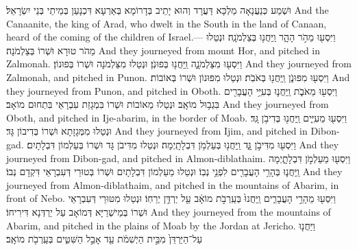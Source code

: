 {וּשְׁמַע כְּנַעֲנָאָה מַלְכָּא דַּעֲרָד וְהוּא יָתֵיב בְּדָרוֹמָא בְּאַרְעָא דִּכְנָעַן בְּמֵיתֵי בְּנֵי יִשְׂרָאֵל׃}
{And the Canaanite, the king of Arad, who dwelt in the South in the land of Canaan, heard of the coming of the children of Israel.—}{}
{וַיִּסְע֖וּ מֵהֹ֣ר הָהָ֑ר וַֽיַּחֲנ֖וּ בְּצַלְמֹנָֽה׃}
{וּנְטַלוּ מֵהֹר טוּרָא וּשְׁרוֹ בְּצַלְמֹנָה׃}
{And they journeyed from mount Hor, and pitched in Zalmonah.}{}
{וַיִּסְע֖וּ מִצַּלְמֹנָ֑ה וַֽיַּחֲנ֖וּ בְּפוּנֹֽן׃}
{וּנְטַלוּ מִצַּלְמֹנָה וּשְׁרוֹ בְּפוּנוֹן׃}
{And they journeyed from Zalmonah, and pitched in Punon.}{}
{וַיִּסְע֖וּ מִפּוּנֹ֑ן וַֽיַּחֲנ֖וּ בְּאֹבֹֽת׃}
{וּנְטַלוּ מִפּוּנוֹן וּשְׁרוֹ בְּאוֹבוֹת׃}
{And they journeyed from Punon, and pitched in Oboth.}{}
{וַיִּסְע֖וּ מֵאֹבֹ֑ת וַֽיַּחֲנ֛וּ בְּעִיֵּ֥י הָעֲבָרִ֖ים בִּגְב֥וּל מוֹאָֽב׃
}
{וּנְטַלוּ מֵאוֹבוֹת וּשְׁרוֹ בִּמְגָזַת עִבְרָאֵי בִּתְחוּם מוֹאָב׃}
{And they journeyed from Oboth, and pitched in Ije-abarim, in the border of Moab.}{}
{וַיִּסְע֖וּ מֵעִיִּ֑ים וַֽיַּחֲנ֖וּ בְּדִיבֹ֥ן גָּֽד׃}
{וּנְטַלוּ מִמְּגָזָתָא וּשְׁרוֹ בְּדִיבוֹן גָּד׃}
{And they journeyed from Ijim, and pitched in Dibon-gad.}{}
{וַיִּסְע֖וּ מִדִּיבֹ֣ן גָּ֑ד וַֽיַּחֲנ֖וּ בְּעַלְמֹ֥ן דִּבְלָתָֽיְמָה׃}
{וּנְטַלוּ מִדִּיבֹן גָּד וּשְׁרוֹ בְּעַלְמוֹן דִּבְלָתָיִם׃}
{And they journeyed from Dibon-gad, and pitched in Almon-diblathaim.}{}
{וַיִּסְע֖וּ מֵעַלְמֹ֣ן דִּבְלָתָ֑יְמָה וַֽיַּחֲנ֛וּ בְּהָרֵ֥י הָעֲבָרִ֖ים לִפְנֵ֥י נְבֽוֹ׃}
{וּנְטַלוּ מֵעַלְמוֹן דִּבְלָתָיִם וּשְׁרוֹ בְּטוּרֵי דְּעִבְרָאֵי דִּקְדָם נְבוֹ׃}
{And they journeyed from Almon-diblathaim, and pitched in the mountains of Abarim, in front of Nebo.}{}
{וַיִּסְע֖וּ מֵהָרֵ֣י הָעֲבָרִ֑ים וַֽיַּחֲנוּ֙ בְּעַֽרְבֹ֣ת מוֹאָ֔ב עַ֖ל יַרְדֵּ֥ן יְרֵחֽוֹ׃}
{וּנְטַלוּ מִטּוּרֵי דְּעִבְרָאֵי וּשְׁרוֹ בְּמֵישְׁרַיָּא דְּמוֹאָב עַל יַרְדְּנָא דִּירִיחוֹ׃}
{And they journeyed from the mountains of Abarim, and pitched in the plains of Moab by the Jordan at Jericho.}{}
{וַיַּחֲנ֤וּ עַל־הַיַּרְדֵּן֙ מִבֵּ֣ית הַיְשִׁמֹ֔ת עַ֖ד אָבֵ֣ל הַשִּׁטִּ֑ים בְּעַֽרְבֹ֖ת מוֹאָֽב׃ \setuma 
{}}
